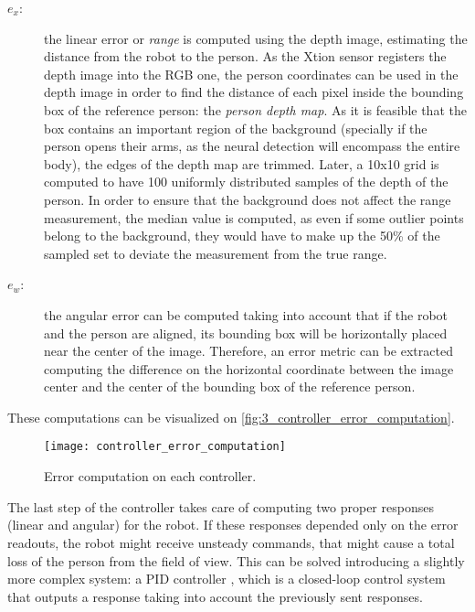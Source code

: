 \begin{description}
	\item[$e_x$:] the linear error or \textit{range} is computed using the depth image, estimating the distance from the robot to the person. As the Xtion sensor registers the depth image into the RGB one, the person coordinates can be used in the depth image in order to find the distance of each pixel inside the bounding box of the reference person: the \textit{person depth map}. As it is feasible that the box contains an important region of the background (specially if the person opens their arms, as the neural detection will encompass the entire body), the edges of the depth map are trimmed. Later, a 10x10 grid is computed to have 100 uniformly distributed samples of the depth of the person. In order to ensure that the background does not affect the range measurement, the median value is computed, as even if some outlier points belong to the background, they would have to make up the 50\% of the sampled set to deviate the measurement from the true range.
	
	\item[$e_w$:] the angular error can be computed taking into account that if the robot and the person are aligned, its bounding box will be horizontally placed near the center of the image. Therefore, an error metric can be extracted computing the difference on the horizontal coordinate between the image center and the center of the bounding box of the reference person.
\end{description}

These computations can be visualized on \autoref{fig:3_controller_error_computation}.


\begin{figure}[h]
	\centering
	\texttt{[image: controller\_error\_computation]}
	\caption{Error computation on each controller.}
	\label{fig:3_controller_error_computation}
\end{figure}

The last step of the controller takes care of computing two proper responses (linear and angular) for the robot. If these responses depended only on the error readouts, the robot might receive unsteady commands, that might cause a total loss of the person from the field of view. This can be solved introducing a slightly more complex system: a PID controller \cite{pid_controllers}, which is a closed-loop control system that outputs a response taking into account the previously sent responses.



